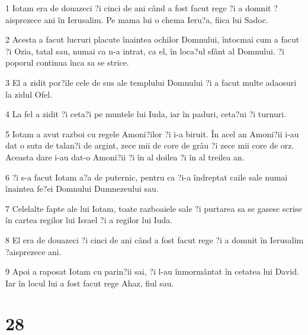 \par 1 Iotam era de douazeci ?i cinci de ani când a fost facut rege ?i a domnit ?aisprezece ani în Ierusalim. Pe mama lui o chema Ieru?a, fiica lui Sadoc.
\par 2 Acesta a facut lucruri placute înaintea ochilor Domnului, întocmai cum a facut ?i Ozia, tatal sau, numai ca n-a intrat, ca el, în loca?ul sfânt al Domnului. ?i poporul continua înca sa se strice.
\par 3 El a zidit por?ile cele de sus ale templului Domnului ?i a facut multe adaosuri la zidul Ofel.
\par 4 La fel a zidit ?i ceta?i pe muntele lui Iuda, iar în paduri, ceta?ui ?i turnuri.
\par 5 Iotam a avut razboi cu regele Amoni?ilor ?i i-a biruit. În acel an Amoni?ii i-au dat o suta de talan?i de argint, zece mii de core de grâu ?i zece mii core de orz. Aceasta dare i-au dat-o Amoni?ii ?i în al doilea ?i în al treilea an.
\par 6 ?i s-a facut Iotam a?a de puternic, pentru ca ?i-a îndreptat caile sale numai înaintea fe?ei Domnului Dumnezeului sau.
\par 7 Celelalte fapte ale lui Iotam, toate razboaiele sale ?i purtarea sa se gasesc scrise în cartea regilor lui Israel ?i a regilor lui Iuda.
\par 8 El era de douazeci ?i cinci de ani când a fost facut rege ?i a domnit în Ierusalim ?aisprezece ani.
\par 9 Apoi a raposat Iotam cu parin?ii sai, ?i l-au înmormântat în cetatea lui David. Iar în locul lui a fost facut rege Ahaz, fiul sau.

\chapter{28}

